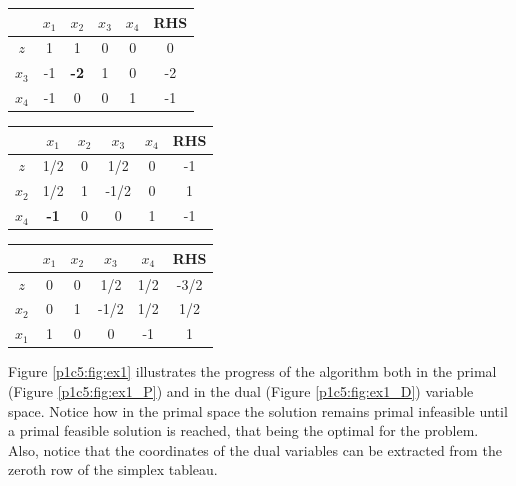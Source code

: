 
\begin{center}
	\begin{tabular}{c|cccc|c}
		 & $x_1$ & $x_2$ & $x_3$ & $x_4$ & RHS \\ \hline 
		$z$  &  1 & 1 & 0 & 0 & 0  \\ \hline
	   $x_3$ & -1 &\textbf{-2} & 1 & 0 & -2 \\
	   $x_4$ & -1 & 0 & 0 & 1 & -1 \\\hline \hline
	\end{tabular}
	
	\begin{tabular}{c|cccc|c}
		 & $x_1$ & $x_2$ & $x_3$ & $x_4$ & RHS \\ \hline 
		$z$  & 1/2 & 0 & 1/2 & 0 & -1  \\ \hline
	   $x_2$ & 1/2 & 1 & -1/2 & 0 & 1 \\
	   $x_4$ & \textbf{-1} & 0 & 0 & 1 & -1 \\ \hline \hline 
	\end{tabular}
	
	\begin{tabular}{c|cccc|c}
		 & $x_1$ & $x_2$ & $x_3$ & $x_4$ & RHS \\ \hline 
		$z$  & 0 & 0 & 1/2 & 1/2 & -3/2  \\ \hline
	   $x_2$ & 0 & 1 & -1/2 & 1/2 & 1/2 \\
	   $x_1$ & 1 & 0 & 0 & -1 & 1 \\ \hline 
	\end{tabular}
\end{center}

Figure \ref{p1c5:fig:ex1} illustrates the progress of the algorithm both in the primal (Figure \ref{p1c5:fig:ex1_P}) and in the dual (Figure \ref{p1c5:fig:ex1_D}) variable space. Notice how in the primal space the solution remains primal infeasible until a primal feasible solution is reached, that being the optimal for the problem. Also, notice that the coordinates of the dual variables can be extracted from the zeroth row of the simplex tableau.

